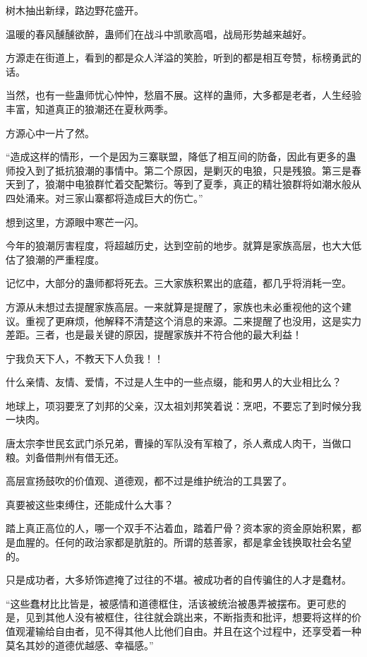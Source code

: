 \begin{this_body}
树木抽出新绿，路边野花盛开。

温暖的春风醺醺欲醉，蛊师们在战斗中凯歌高唱，战局形势越来越好。

方源走在街道上，看到的都是众人洋溢的笑脸，听到的都是相互夸赞，标榜勇武的话。

当然，也有一些蛊师忧心忡忡，愁眉不展。这样的蛊师，大多都是老者，人生经验丰富，知道真正的狼潮还在夏秋两季。

方源心中一片了然。

“造成这样的情形，一个是因为三寨联盟，降低了相互间的防备，因此有更多的蛊师投入到了抵抗狼潮的事情中。第二个原因，是剿灭的电狼，只是残狼。第三是春天到了，狼潮中电狼群忙着交配繁衍。等到了夏季，真正的精壮狼群将如潮水般从四处涌来。对三家山寨都将造成巨大的伤亡。”

想到这里，方源眼中寒芒一闪。

今年的狼潮厉害程度，将超越历史，达到空前的地步。就算是家族高层，也大大低估了狼潮的严重程度。

记忆中，大部分的蛊师都将死去。三大家族积累出的底蕴，都几乎将消耗一空。

方源从未想过去提醒家族高层。一来就算是提醒了，家族也未必重视他的这个建议。重视了更麻烦，他解释不清楚这个消息的来源。二来提醒了也没用，这是实力差距。三者，也是最关键的原因，提醒家族并不符合他的最大利益！

宁我负天下人，不教天下人负我！！

什么亲情、友情、爱情，不过是人生中的一些点缀，能和男人的大业相比么？

地球上，项羽要烹了刘邦的父亲，汉太祖刘邦笑着说：烹吧，不要忘了到时候分我一块肉。

唐太宗李世民玄武门杀兄弟，曹操的军队没有军粮了，杀人煮成人肉干，当做口粮。刘备借荆州有借无还。

高层宣扬鼓吹的价值观、道德观，都不过是维护统治的工具罢了。

真要被这些束缚住，还能成什么大事？

踏上真正高位的人，哪一个双手不沾着血，踏着尸骨？资本家的资金原始积累，都是血腥的。任何的政治家都是肮脏的。所谓的慈善家，都是拿金钱换取社会名望的。

只是成功者，大多矫饰遮掩了过往的不堪。被成功者的自传骗住的人才是蠢材。

“这些蠢材比比皆是，被感情和道德框住，活该被统治被愚弄被摆布。更可悲的是，见到其他人没有被框住，往往就会跳出来，不断指责和批评，想要将这样的价值观灌输给自由者，见不得其他人比他们自由。并且在这个过程中，还享受着一种莫名其妙的道德优越感、幸福感。”


\end{this_body}
